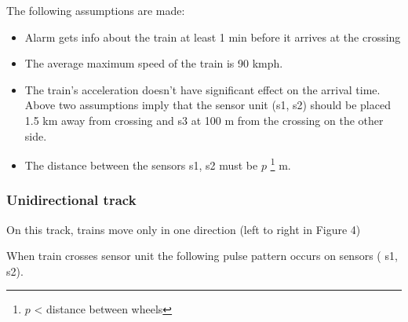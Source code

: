 \documentclass[aps,letterpaper,11pt]{article}
\begin{document}
The following assumptions are made:
\begin{itemize}
  \item Alarm gets info about the train at least 1 min before it arrives at the crossing
  \item The average maximum speed of the train is 90 kmph.
  \item The train's acceleration doesn't have significant effect on the arrival time.
   Above two assumptions imply that the sensor unit (s1, s2) should be placed 1.5 km away from crossing and s3 at 100 m from the crossing on the other side.
  \item The distance between the sensors s1, s2 must be $p$ \footnote{$p$ < distance between wheels} m.
\end{itemize}

\subsubsection{Unidirectional track}
On this track, trains move only in one direction (left to right in Figure 4)

When train crosses sensor unit the following pulse pattern occurs on sensors (
s1, s2).
\end{document}
